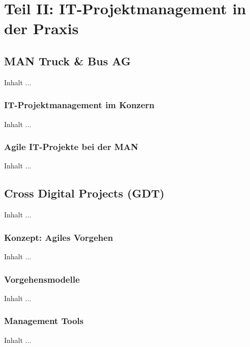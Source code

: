 
\chapter{Teil II: IT-Projektmanagement in der Praxis}
\minitoc 


\section{MAN Truck \& Bus AG}
Inhalt ...

\subsection{IT-Projektmanagement im Konzern}
Inhalt ...

\subsection{Agile IT-Projekte bei der MAN}
Inhalt ...


\section{Cross Digital Projects (GDT)}
Inhalt ...

\subsection{Konzept: Agiles Vorgehen}
Inhalt ...

\subsection{Vorgehensmodelle}
Inhalt ...

\subsection{Management Tools}
Inhalt ...
